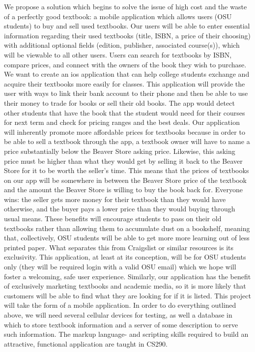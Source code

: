 \documentclass[12pt]{article}
\begin{document}
We propose a solution which begins to solve the issue of high cost and the waste of a perfectly good textbook: a mobile application which allows users (OSU students) to buy and sell used textbooks. Our users will be able to enter essential information regarding their used textbooks (title, ISBN, a price of their choosing) with additional optional fields (edition, publisher, associated course(s)), which will be viewable to all other users. Users can search for textbooks by ISBN, compare prices, and connect with the owners of the book they wish to purchase.
We want to create an ios application that can help college students exchange and acquire their textbooks more easily for classes.
This application will provide the user with ways to link their bank account to their phone and then be able to use their money to trade for books or sell their old books.
The app would detect other students that have the book that the student would need for their courses for next term and check for pricing ranges and the best deals.
Our application will inherently promote more affordable prices for textbooks because in order to be able to sell a textbook through the app, a textbook owner will have to name a price substantially below the Beaver Store asking price. Likewise, this asking price must be higher than what they would get by selling it back to the Beaver Store for it to be worth the seller’s time. This means that the prices of textbooks on our app will be somewhere in between the Beaver Store price of the textbook and the amount the Beaver Store is willing to buy the book back for. Everyone wins: the seller gets more money for their textbook than they would have otherwise, and the buyer pays a lower price than they would buying through usual means. These benefits will encourage students to pass on their old textbooks rather than allowing them to accumulate dust on a bookshelf, meaning that, collectively, OSU students will be able to get more more learning out of less printed paper. 
What separates this from Craigslist or similar resources is its exclusivity. This application, at least at its conception, will be for OSU students only (they will be required login with a valid OSU email) which we hope will foster a welcoming, safe user experience. Similarly, our application has the benefit of exclusively marketing textbooks and academic media, so it is more likely that customers will be able to find what they are looking for if it is listed. 
This project will take the form of a mobile application. In order to do everything outlined above, we will need several cellular devices for testing, as well a database in which to store textbook information and a server of some description to serve such information. The markup language- and scripting skills required to build an attractive, functional application are taught in CS290. 
\end{document}
